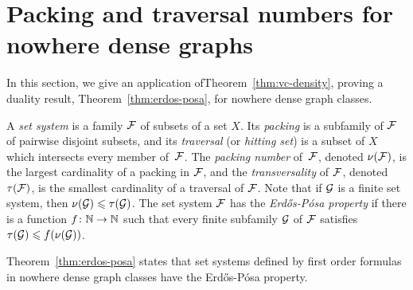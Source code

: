 \section{Packing and traversal numbers for nowhere dense graphs}\label{sec:ep}
In this section, we give an application 
ofTheorem~\ref{thm:vc-density}, proving a
duality result, Theorem~\ref{thm:erdos-posa}, 
for nowhere dense graph classes. 

A \emph{set system} is a family  $\cal F$ of subsets of a set $X$.
Its  \emph{packing} is a subfamily of $\cal F$ of pairwise disjoint subsets, and its \emph{traversal} (or \emph{hitting set}) is a subset of $X$ which intersects every member of~$\cal F$.
The \emph{packing number} of~$\cal F$, denoted $\nu(\cal F)$, is the largest cardinality of a packing in $\cal F$,
and the \emph{transversality} of $\cal F$, denoted
$\tau(\cal F)$, is the smallest cardinality of a traversal of $\cal F$.
Note that if $\cal G$ is a finite set system, then
$\nu({\cal G})\le \tau(\cal G)$. 
The set system $\cal F$ has the \emph{Erd{\H o}s-P\'{o}sa property} if there is a function $f\from\N\to\N$ such that every finite subfamily $\cal G$ of $\cal F$
satisfies $\tau({\cal G})\le f(\nu(\cal G))$. 

Theorem~\ref{thm:erdos-posa} states that set systems defined by 
first order formulas in nowhere dense graph classes have the 
Erd{\H o}s-P\'{o}sa property. 



